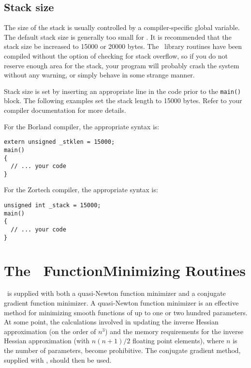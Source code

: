 \documentclass{admbmanual}
\begin{document}
\section{Stack size}

The size of the stack is usually controlled by a compiler-specific global
variable. The default stack size is generally too small for \scAD.
It is recommended that the stack size be increased to 15000 or 20000 bytes.
The \scAD\ library routines have been
compiled without the option of checking 
for stack overflow, so if you do not
reserve enough area for the stack, your program will probably crash
the system without any warning, or simply behave in some strange manner. 

Stack size is set by inserting an appropriate line in the code prior
to the \texttt{main()} block.
The following examples set the stack length to 15000 bytes.
Refer to your compiler documentation for more details.

For the Borland compiler, the appropriate syntax is:
\begin{lstlisting}
extern unsigned _stklen = 15000; 
main()
{
  // ... your code
}
\end{lstlisting}
\noindent For the Zortech compiler, the appropriate syntax is:
\begin{lstlisting}
unsigned int _stack = 15000; 
main()
{
  // ... your code
}
\end{lstlisting}


\chapter{The \scAD\ Function\br Minimizing Routines}\label{ch:function-minimizing}

\scAD\ is supplied with both a quasi-Newton function minimizer
and a conjugate gradient function minimizer.
A quasi-Newton function minimizer
is an effective method for minimizing smooth functions of up to one 
or two hundred parameters. At some point, the calculations involved in
updating the inverse Hessian approximation (on the order of
$n^3$) and the memory requirements for
the inverse Hessian approximation (with $n(n+1)/2$ floating point elements), 
where $n$ is the number of parameters, become prohibitive.  
The conjugate gradient method, supplied with \scAD, should then
be used.  
\end{document}
